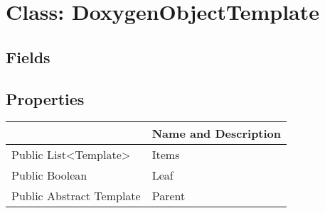 \documentclass[11pt, oneside, a4paper]{book}
\begin{document}
\hypertarget{SoftwareEngineeringTools.{}Documentation.{}DoxygenObjectTemplate}{}
\section{Class: DoxygenObjectTemplate}

\subsection{Fields}

\subsection{Properties}
\begin{center}
\begin{tabular}{| p{3cm} | p{12cm} | }
\hline
\textbf{ } & \textbf{ Name and Description}\\
\hline
 Public  List<Template> &  Items\hypertarget{SoftwareEngineeringTools.{}Documentation.{}DoxygenObjectTemplate.{}Items}{}\\
\hline
 Public  Boolean &  Leaf\hypertarget{SoftwareEngineeringTools.{}Documentation.{}DoxygenObjectTemplate.{}Leaf}{}\\
\hline
 Public  Abstract  Template &  Parent\hypertarget{SoftwareEngineeringTools.{}Documentation.{}DoxygenObjectTemplate.{}Parent}{}\\
\hline
\end{tabular}
\end{center}
\end{document}
